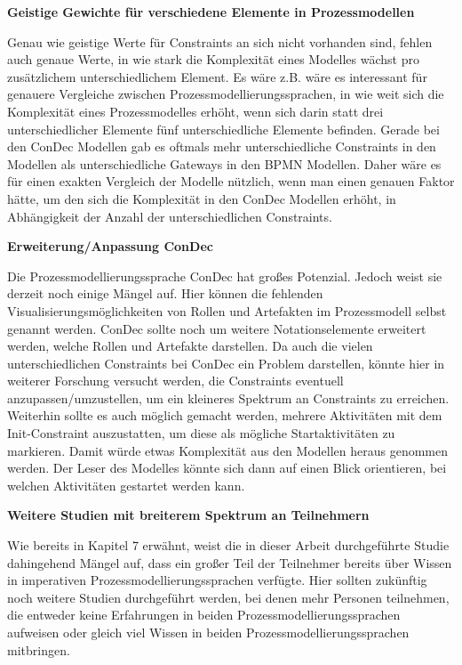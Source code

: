\textbf{Geistige Gewichte für verschiedene Elemente in Prozessmodellen}

Genau wie geistige Werte für Constraints an sich nicht vorhanden sind, fehlen auch genaue Werte, in wie stark die Komplexität eines Modelles wächst pro zusätzlichem unterschiedlichem Element. Es wäre z.B. wäre es interessant für genauere Vergleiche zwischen Prozessmodellierungssprachen, in wie weit sich die Komplexität eines Prozessmodelles erhöht, wenn sich darin statt drei unterschiedlicher Elemente fünf unterschiedliche Elemente befinden. Gerade bei den ConDec Modellen gab es oftmals mehr unterschiedliche Constraints in den Modellen als unterschiedliche Gateways in den BPMN Modellen. Daher wäre es für einen exakten Vergleich der Modelle nützlich, wenn man einen genauen Faktor hätte, um den sich die Komplexität in den ConDec Modellen erhöht, in Abhängigkeit der Anzahl der unterschiedlichen Constraints. \newline 


\textbf{Erweiterung/Anpassung ConDec}

Die Prozessmodellierungssprache ConDec hat großes Potenzial. Jedoch weist sie derzeit noch einige Mängel auf. Hier können die fehlenden Visualisierungsmöglichkeiten von Rollen und Artefakten im Prozessmodell selbst genannt werden. ConDec sollte noch um weitere Notationselemente erweitert werden, welche Rollen und Artefakte darstellen.\newline
Da auch die vielen unterschiedlichen Constraints bei ConDec ein Problem darstellen, könnte hier in weiterer Forschung versucht werden, die Constraints eventuell anzupassen/umzustellen, um ein kleineres Spektrum an Constraints zu erreichen.\newline
Weiterhin sollte es auch möglich gemacht werden, mehrere Aktivitäten mit dem Init-Constraint auszustatten, um diese als mögliche Startaktivitäten zu markieren. Damit würde etwas Komplexität aus den Modellen heraus genommen werden. Der Leser des Modelles könnte sich dann auf einen Blick orientieren, bei welchen Aktivitäten gestartet werden kann.\newline

\newpage

\textbf{Weitere Studien mit breiterem Spektrum an Teilnehmern}

Wie bereits in Kapitel 7 erwähnt, weist die in dieser Arbeit durchgeführte Studie dahingehend Mängel auf, dass ein großer Teil der Teilnehmer bereits über Wissen in imperativen Prozessmodellierungssprachen verfügte. Hier sollten zukünftig noch weitere Studien durchgeführt werden, bei denen mehr Personen teilnehmen, die entweder keine Erfahrungen in beiden Prozessmodellierungssprachen aufweisen oder gleich viel Wissen in beiden Prozessmodellierungssprachen mitbringen.\newline






